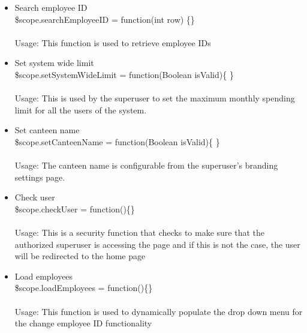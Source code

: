 \documentclass[a4paper,12pt]{article}
\begin{document}
\begin{enumerate}
\begin{itemize}
		\item Search employee ID \\ \$scope.searchEmployeeID = function(int row) \{\}
		\\ \\ Usage: This function is used to retrieve employee IDs 
		\item Set system wide limit \\ \$scope.setSystemWideLimit = function(Boolean isValid)\{ \} \\ \\ Usage: This is used by the superuser to set the maximum monthly spending limit for all the users of the system.
		 \item Set canteen name \\ \$scope.setCanteenName = function(Boolean isValid)\{ \}
		\\ \\ Usage: The canteen name is configurable from the superuser's branding settings page.
		\item Check user \\ \$scope.checkUser = function()\{\}
		\\ \\Usage: This is a security function that checks to make sure that the authorized superuser is accessing the page and if this is not the case, the user will be redirected to the home page
		\item Load employees \\ \$scope.loadEmployees = function()\{\}
		\\ \\Usage: This function is used to dynamically populate the drop down menu for the change employee ID functionality
	\end{itemize}
\end{enumerate}
\end{document}
